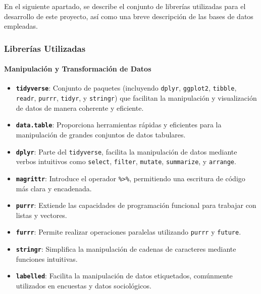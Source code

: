 \documentclass[
  12pt,
]{book}
\providecommand{\tightlist}{%
  \setlength{\itemsep}{0pt}\setlength{\parskip}{0pt}}
\begin{document}
En el siguiente apartado, se describe el conjunto de librerías utilizadas para el desarrollo de este proyecto, así como una breve descripción de las bases de datos empleadas.

\hypertarget{libreruxedas-utilizadas}{%
\subsubsection*{Librerías Utilizadas}\label{libreruxedas-utilizadas}}

\hypertarget{manipulaciuxf3n-y-transformaciuxf3n-de-datos}{%
\paragraph*{Manipulación y Transformación de Datos}\label{manipulaciuxf3n-y-transformaciuxf3n-de-datos}}

\begin{itemize}
\tightlist
\item
  \textbf{\texttt{tidyverse}}: Conjunto de paquetes (incluyendo \texttt{dplyr}, \texttt{ggplot2}, \texttt{tibble}, \texttt{readr}, \texttt{purrr}, \texttt{tidyr}, y \texttt{stringr}) que facilitan la manipulación y visualización de datos de manera coherente y eficiente.
\item
  \textbf{\texttt{data.table}}: Proporciona herramientas rápidas y eficientes para la manipulación de grandes conjuntos de datos tabulares.
\item
  \textbf{\texttt{dplyr}}: Parte del \texttt{tidyverse}, facilita la manipulación de datos mediante verbos intuitivos como \texttt{select}, \texttt{filter}, \texttt{mutate}, \texttt{summarize}, y \texttt{arrange}.
\item
  \textbf{\texttt{magrittr}}: Introduce el operador \texttt{\%\textgreater{}\%}, permitiendo una escritura de código más clara y encadenada.
\item
  \textbf{\texttt{purrr}}: Extiende las capacidades de programación funcional para trabajar con listas y vectores.
\item
  \textbf{\texttt{furrr}}: Permite realizar operaciones paralelas utilizando \texttt{purrr} y \texttt{future}.
\item
  \textbf{\texttt{stringr}}: Simplifica la manipulación de cadenas de caracteres mediante funciones intuitivas.
\item
  \textbf{\texttt{labelled}}: Facilita la manipulación de datos etiquetados, comúnmente utilizados en encuestas y datos sociológicos.
\end{itemize}
\end{document}
